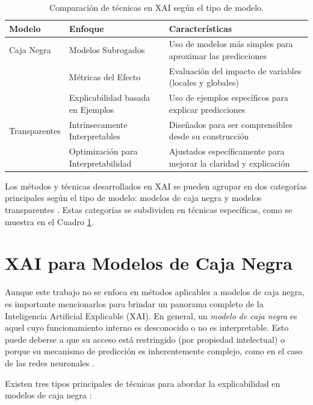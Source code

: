 \begin{table}[H]
    \centering
    \scriptsize %
    \renewcommand{\arraystretch}{1.5} %
    \begin{tabular}{p{3.5cm} p{5cm} p{5.8cm}}
        \toprule
        \textbf{Modelo} & \textbf{Enfoque} & \textbf{Características} \\
        \midrule
        Caja Negra & Modelos Subrogados & Uso de modelos más simples para aproximar las predicciones \\ 
        & Métricas del Efecto & Evaluación del impacto de variables (locales y globales) \\ 
        & Explicabilidad basada en Ejemplos & Uso de ejemplos específicos para explicar predicciones \\
        \midrule
        Transparentes & Intrínsecamente Interpretables & Diseñados para ser comprensibles desde su construcción \\
        & Optimización para Interpretabilidad & Ajustados específicamente para mejorar la claridad y explicación \\ 
        \bottomrule
    \end{tabular}
    \caption{Comparación de técnicas en XAI según el tipo de modelo.}
    \label{fig:cuadro-xai}
\end{table}

Los métodos y técnicas desarrollados en XAI se pueden agrupar en dos categorías principales según el tipo de modelo: modelos de caja negra y modelos transparentes \cite{curso-xai}. Estas categorías se subdividen en técnicas específicas, como se muestra en el Cuadro \ref{fig:cuadro-xai}.


\section{XAI para Modelos de Caja Negra}

Aunque este trabajo no se enfoca en métodos aplicables a modelos de caja negra, es importante mencionarlos para brindar un panorama completo de la Inteligencia Artificial Explicable (XAI). En general, un \emph{modelo de caja negra} es aquel cuyo funcionamiento interno es desconocido o no es interpretable. Esto puede deberse a que su acceso está restringido (por propiedad intelectual) o porque su mecanismo de predicción es inherentemente complejo, como en el caso de las redes neuronales \cite{curso-xai, Rudin-2019}.

Existen tres tipos principales de técnicas para abordar la explicabilidad en modelos de caja negra \cite{curso-xai}:

